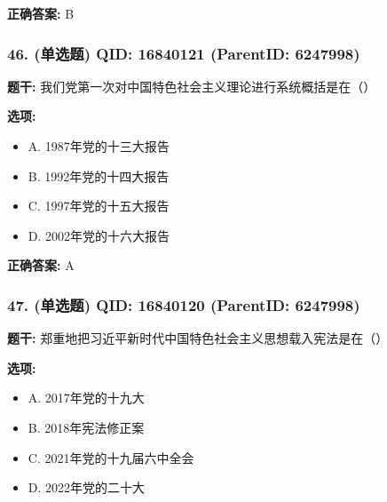 \documentclass[12pt,UTF8]{ctexart}
\begin{document}
\textbf{正确答案:}
B

\vspace{0.3em}\hrulefill\vspace{0.7em}

\subsubsection*{46. (单选题) \small QID: 16840121 (ParentID: 6247998)}

\textbf{题干:}
我们党第一次对中国特色社会主义理论进行系统概括是在（）



\textbf{选项:}
\begin{itemize}[leftmargin=*]

  \item A. 1987年党的十三大报告

  \item B. 1992年党的十四大报告

  \item C. 1997年党的十五大报告

  \item D. 2002年党的十六大报告

\end{itemize}

\textbf{正确答案:}
A

\vspace{0.3em}\hrulefill\vspace{0.7em}

\subsubsection*{47. (单选题) \small QID: 16840120 (ParentID: 6247998)}

\textbf{题干:}
郑重地把习近平新时代中国特色社会主义思想载入宪法是在（）



\textbf{选项:}
\begin{itemize}[leftmargin=*]

  \item A. 2017年党的十九大

  \item B. 2018年宪法修正案

  \item C. 2021年党的十九届六中全会

  \item D. 2022年党的二十大

\end{itemize}
\end{document}

